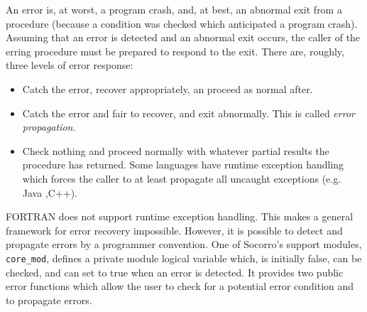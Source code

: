 \label{errorsec}

An error is, at worst, a program crash, and, at best, an abnormal exit from
a procedure (because a condition was checked which anticipated a program
crash).  Assuming that an error is detected and an abnormal exit occurs,
the caller of the erring procedure must be prepared to respond to the exit.
There are, roughly, three levels of error response: 

\begin{itemize}
\item Catch the error, recover appropriately, an proceed as normal after.
\item Catch the error and fair to recover, and exit abnormally.  This is
called {\em error propagation}.
\item Check nothing and proceed normally with whatever partial results 
the procedure  has returned.  Some languages have runtime exception handling
which forces the caller to at least propagate all uncaught exceptions (e.g.
Java ,C++).
\end{itemize}

FORTRAN does not support runtime exception handling.  This makes a
general framework for error recovery impossible.  However, it is
possible to detect and propagate errors by a programmer convention.
One of Socorro's support modules, \verb+core_mod+, defines a private
module logical variable which, is initially false, can be checked, and
can set to true when an error is detected.  It provides two public error
functions which allow the user to check for a potential error condition
and to propagate errors.

